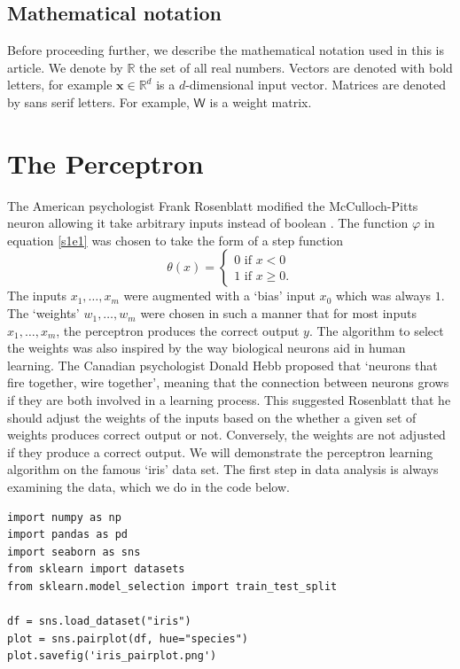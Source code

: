 \documentclass[11pt]{article}
\numberwithin{equation}{section}
\renewcommand{\vec}{\mathbf}
\newcommand{\mat}{\mathsf}
\begin{document}
\subsection{Mathematical notation}
Before proceeding further, we describe the mathematical notation used in
this is article. We denote by $\mathbb{R}$ the set of all real numbers. Vectors
are denoted with bold letters, for example $\vec{x} \in \mathbb{R}^d$ is a 
$d$-dimensional input vector. Matrices are denoted by sans serif letters. 
For example, $\mat{W}$ is a weight matrix.

\section{The Perceptron}\label{s2}
The American psychologist Frank Rosenblatt modified the McCulloch-Pitts neuron
allowing it take arbitrary inputs instead of boolean 
\cite{rosenblatt1958perceptron}. The function $\varphi$ in equation \eqref{s1e1}
was chosen to take the form of a step function
\begin{equation}\label{s2e1}
\theta(x) = \begin{cases}
0 \text{ if } x < 0 \\
1 \text{ if } x \ge 0.
\end{cases}
\end{equation}
The inputs $x_1, \ldots, x_m$ were augmented with a `bias' input $x_0$ which
was always $1$. The `weights' $w_1, \ldots, w_m$ were chosen in such a manner
that for most inputs $x_1, \ldots, x_m$, the perceptron produces the correct
output $y$. The algorithm to select the weights was also inspired by the way
biological neurons aid in human learning. The Canadian psychologist Donald Hebb
proposed \cite{hebb1949organization} that `neurons that fire together, wire
together', meaning that the connection between neurons grows if they are both
involved in a learning process. This suggested Rosenblatt that he should 
adjust the weights of the inputs based on the whether a given set of weights
produces correct output or not. Conversely, the weights are not adjusted if
they produce a correct output. We will demonstrate the perceptron learning
algorithm on the famous `iris' data set. The first step in data analysis is
always examining the data, which we do in the code below.
\begin{verbatim}
import numpy as np
import pandas as pd
import seaborn as sns
from sklearn import datasets
from sklearn.model_selection import train_test_split

df = sns.load_dataset("iris")
plot = sns.pairplot(df, hue="species")
plot.savefig('iris_pairplot.png')
\end{verbatim}
\end{document}

